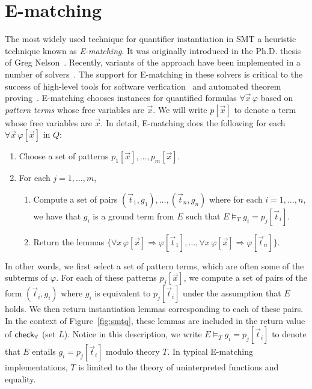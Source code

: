 \documentclass[oribibl]{llncs}
\begin{document}
\section{E-matching}
\label{sec:ematching}

The most widely used technique for quantifier instantiation in SMT a heuristic technique known as \emph{E-matching}.
It was originally introduced in the Ph.D. thesis of Greg Nelson~\cite{Nelson:1980:TPV:909447}.
Recently, variants of the approach have been implemented in a number of solvers~\cite{Detlefs03simplify:a,DBLP:conf/cav/BarrettT07,Z3,DBLP:conf/cade/BoutonODF09,CVC4-CAV-11,DBLP:conf/lpar/Rummer12}.
The support for E-matching in these solvers is critical to the success of high-level tools for 
software verfication~\cite{DBLP:conf/icse/Leino04,DBLP:conf/itp/ChapmanS14} and automated theorem proving~\cite{blanchette2013extending,bobot2011why3}.
E-matching chooses instances for quantified formulas $\forall \vec x\, \varphi$
based on \emph{pattern terms} whose free variables are $\vec x$.
We will write $p[ \vec x ]$ to denote a term whose free variables are $\vec x$.
In detail, 
E-matching does the following for each $\forall \vec x\, \varphi[ \vec x ]$ in $Q$:
\begin{enumerate}
\item Choose a set of patterns $p_1[ \vec x ], \ldots, p_m[ \vec x ]$.
\item For each $j = 1, \ldots, m$,
\begin{enumerate}
\item Compute a set of pairs $(\vec t_{1},g_{1}), \ldots, (\vec t_{n}, g_{n})$ 
where for each $i = 1, \ldots, n$, we have that $g_i$ is a ground term from $E$ such that $E \models_T g_{i} = p_j[ \vec t_{i} ]$.
\item Return the lemmas $\{ \forall x\, \varphi[\vec x] \Rightarrow \varphi[\vec t_{1}], \ldots, \forall x\, \varphi[\vec x] \Rightarrow \varphi[\vec t_{n}] \}$.
\end{enumerate}
\end{enumerate}

In other words, we first select a set of pattern terms, which are often some of the subterms of $\varphi$.
For each of these patterns $p_j[ \vec x ]$, we compute a set of pairs of the form $( \vec t_i, g_i )$ where 
$g_i$ is equivalent to $p_j[ \vec t_i ]$ under the assumption that $E$ holds.
We then return instantiation lemmas corresponding to each of these pairs. 
In the context of Figure~\ref{fig:smtq}, these lemmas are included in the return value of $\small\mathsf{check}_\forall$ (set $L$).
Notice in this description, we write $E \models_T g_{i} = p_j[ \vec t_{i} ]$ to denote that $E$ entails
$g_{i} = p_j[ \vec t_{i} ]$ modulo theory $T$.  In typical E-matching implementations, $T$ is limited to the theory of uninterpreted functions and equality.
\end{document}
